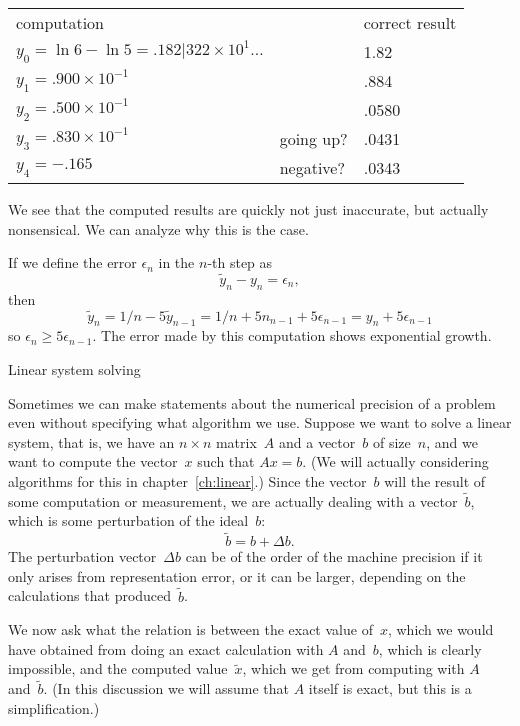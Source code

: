 \begin{tabular}{lll}
  computation&&correct result\\
  $y_0=\ln 6 - \ln 5=.182|322\times 10^{1}\ldots$&&1.82\\
  $y_1=.900\times 10^{-1}$&&.884\\
  $y_2=.500\times 10^{-1}$&&.0580\\
  $y_3=.830\times 10^{-1}$&going up?&.0431\\
  $y_4=-.165$&negative?&.0343
\end{tabular}

We see that the computed results are quickly not just inaccurate, but
actually nonsensical. We can analyze why this is the case.

If we define the error $\epsilon_n$ in the $n$-th step as
\[ \tilde y_n-y_n=\epsilon_n,\] then
\[ \tilde y_n=1/n-5\tilde y_{n-1}=1/n+5n_{n-1}+5\epsilon_{n-1}
    = y_n+5\epsilon_{n-1} \]
so $\epsilon_n\geq 5\epsilon_{n-1}$. The error made by this
computation shows exponential growth.

 {Linear system solving}

Sometimes we can make statements about the numerical precision of a
problem even without specifying what algorithm we use. Suppose we want
to solve a linear system, that is, we have an $n\times n$ matrix~$A$
and a vector~$b$ of size~$n$, and we want to compute the vector~$x$
such that $Ax=b$. (We will actually considering algorithms for this in
chapter~\ref{ch:linear}.) Since the vector~$b$ will the result of some
computation or measurement, we are actually dealing with a
vector~$\tilde b$, which is some perturbation of the ideal~$b$:
\[ \tilde b =  b+\Delta b. \]
The perturbation vector~$\Delta b$ can be of the order of the machine
precision if it only arises from representation error, or it can be
larger, depending on the calculations that produced~$\tilde b$.

We now ask what the relation is between the exact value of~$x$, which
we would have obtained from doing an exact calculation with $A$
and~$b$, which is clearly impossible, and
the computed value~$\tilde x$, which we get from computing with $A$
and~$\tilde b$. (In this discussion we will assume that $A$ itself is
exact, but this is a simplification.)

